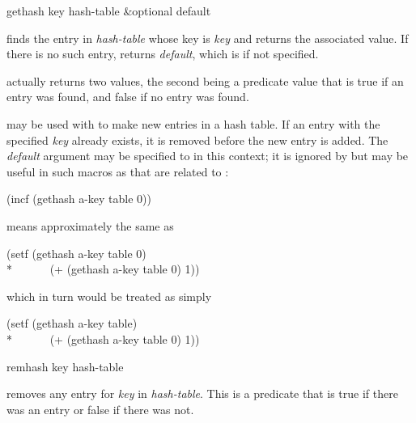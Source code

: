 \begin{defun}[Function]
gethash key hash-table &optional default

 finds the entry in \emph{hash-table} whose key is \emph{key}
and returns the
associated value.  If there is no such entry,  returns \emph{default},
which is {\false} if not specified.

 actually returns two values, the second being a predicate
value that is true if an entry was found, and false if no entry was found.

 may be used with  to make new entries in a hash
table.  If an entry with the specified \emph{key} already exists, it is
removed before the new entry is added.  The \emph{default} argument may be
specified to  in this context; it is ignored by 
but may be useful in such macros as  that are related to :
\begin{lisp}
(incf (gethash a-key table 0))
\end{lisp}
means approximately the same as
\begin{lisp}
(setf (gethash a-key table 0) \\*
~~~~~~(+ (gethash a-key table 0) 1))
\end{lisp}
which in turn would be treated as simply
\begin{lisp}
(setf (gethash a-key table) \\*
~~~~~~(+ (gethash a-key table 0) 1))
\end{lisp}
\end{defun}

\begin{defun}[Function]
remhash key hash-table

 removes
any entry for \emph{key} in \emph{hash-table}.  This is a predicate
that is true if there was an
entry or false if there was not.
\end{defun}

